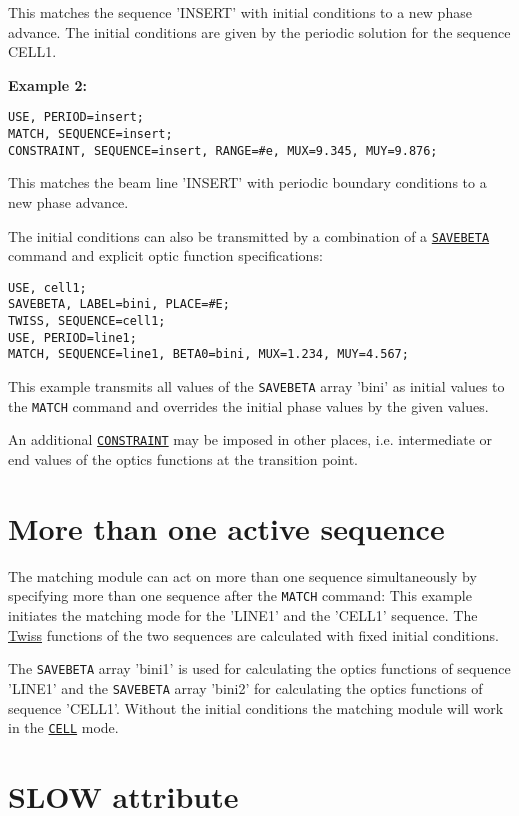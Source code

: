 This matches the sequence 'INSERT' with initial conditions to a new
phase advance. The initial conditions are given by the periodic solution
for the sequence CELL1. 
    
\textbf{Example 2:}	
\begin{verbatim}
USE, PERIOD=insert;
MATCH, SEQUENCE=insert;
CONSTRAINT, SEQUENCE=insert, RANGE=#e, MUX=9.345, MUY=9.876;
\end{verbatim}
This matches the beam line 'INSERT' with periodic boundary conditions to
a new phase advance. 

The initial conditions can also be transmitted by a combination of a
\hyperref[sec:savebeta]{\texttt{SAVEBETA}} command and explicit
optic function specifications: 
\begin{verbatim}
USE, cell1;
SAVEBETA, LABEL=bini, PLACE=#E;
TWISS, SEQUENCE=cell1;
USE, PERIOD=line1;
MATCH, SEQUENCE=line1, BETA0=bini, MUX=1.234, MUY=4.567;
\end{verbatim}

This example transmits all values of the \texttt{SAVEBETA} array 'bini' as
initial values to the \texttt{MATCH} command and overrides the initial phase
values by the given values.

An additional \hyperref[sec:constraint]{\texttt{CONSTRAINT}} may be
imposed in other places, i.e. intermediate or end values of the optics
functions at the transition point.  
 
\section{More than one active sequence}

The matching module can act on more than one sequence simultaneously by
specifying more than one sequence after the \texttt{MATCH} command: 
This example initiates the matching mode for the 'LINE1' and the 'CELL1'
sequence. The \hyperref[chap:twiss]{Twiss} functions of the
two sequences are calculated with fixed initial conditions. 

The \texttt{SAVEBETA} array 'bini1' is used for calculating the optics
functions of sequence 'LINE1' and the \texttt{SAVEBETA} array 'bini2'
for calculating the optics functions of sequence 'CELL1'. Without the
initial conditions the matching module will work in the
\hyperref[sec:cell]{\texttt{CELL}} mode. 
 
\section{SLOW attribute}

